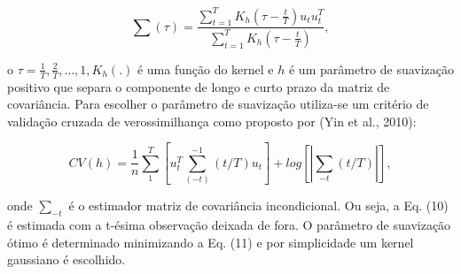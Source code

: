 \documentclass[a4paper,12pt] {article}
\begin{document}
 	 	\begin{equation}
 	 	\hat{\sum}(\tau)=\frac{\sum_{t=1}^{T} K_h (\tau-\frac{t}{T})u_t u_t^T}{\sum_{t=1}^{T}K_h(\tau-\frac{t}{T})},
 	 	\end{equation}
 	 	
 	 	
 	 	o $ \tau = \frac{1}{T}, \frac{2}{T}, \dots, 1, K_h (.)$ é uma função do kernel e $h$ é um parâmetro de suavização positivo que separa o componente de longo e curto prazo da matriz de covariância. Para escolher  o parâmetro de suavização utiliza-se um critério de validação cruzada de verossimilhança  
 	 	como proposto por (Yin et al., 2010):
 	 	
 	 	\begin{equation}
 	 	CV(h)= \frac{1}{n} \sum_{1}^{T}    [u_t^T \sum_{(-t)}^{-1} (t/T)u_t] + log[|\sum_{-t} (t/T)|],
 	 	\end{equation}
 	 	
 	 	onde $\sum_{-t}$ é o estimador  matriz de covariância incondicional. Ou seja, a Eq. (10) é estimada com a t-ésima observação deixada de fora. O parâmetro de suavização ótimo é determinado minimizando a Eq. (11) e por simplicidade um kernel gaussiano é escolhido. 

 
 
\end{document}
